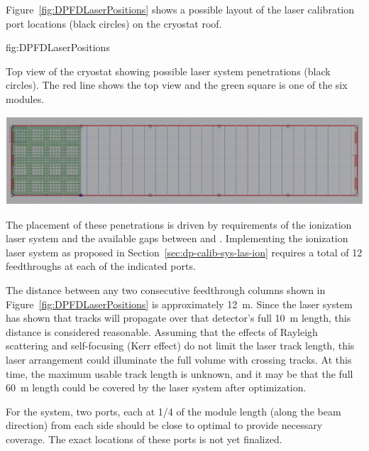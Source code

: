 
Figure~\ref{fig:DPFDLaserPositions} shows a possible layout of the laser calibration port locations (black circles) on the cryostat roof. 

\begin{dunefigure}{fig:DPFDLaserPositions}
{Top view of the \dpmod %
cryostat showing possible laser system penetrations (black circles). The red line shows the  top view and the green square is one of the six  modules. 

}
\includegraphics[width=1.0\textwidth]{graphics/DPFDLaserPositions.png}
\end{dunefigure}

The placement of these penetrations is driven by requirements of the ionization laser system and the available gaps between  and . 
Implementing the ionization laser system as proposed in Section~\ref{sec:dp-calib-sys-las-ion} requires a total of \num{12} feedthroughs at each of the indicated ports. 

The distance between any two consecutive feedthrough columns shown in Figure~\ref{fig:DPFDLaserPositions} is approximately \SI{12}{\m}. Since the  laser system has shown that tracks will propagate over that detector's full \SI{10}{\m} length, this distance is considered reasonable. Assuming that the effects of Rayleigh scattering and self-focusing (Kerr effect) do not limit the laser track length, this laser arrangement could illuminate the full volume with crossing tracks.
At this time, the maximum usable track length is unknown, and it may be that the full \SI{60}{\m} \detmodule length could be covered by the laser system after optimization.

For the  system, two ports, each at 1/4 of the module length (along the beam direction) from each side should be close to optimal to provide necessary coverage. The exact locations of these ports is not yet finalized.
